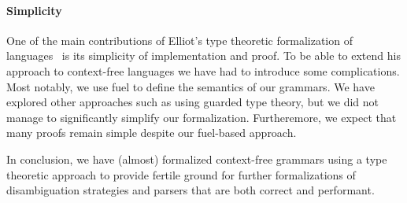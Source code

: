 \paragraph{Simplicity}
One of the main contributions of Elliot's type theoretic formalization of languages~\cite{conal-languages} is its simplicity of implementation and proof. To be able to extend his approach to context-free languages we have had to introduce some complications. Most notably, we use fuel to define the semantics of our grammars. We have explored other approaches such as using guarded type theory, but we did not manage to significantly simplify our formalization. Furtheremore, we expect that many proofs remain simple despite our fuel-based approach.
\medbreak

In conclusion, we have (almost) formalized context-free grammars using a type theoretic approach to provide fertile ground for further formalizations of disambiguation strategies and parsers that are both correct and performant.
